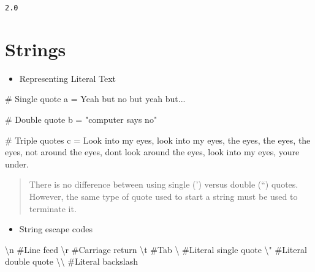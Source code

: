 \documentclass[
  letterpaper,
  DIV=11,
  numbers=noendperiod]{scrreprt}
\newenvironment{Shaded}{\begin{snugshade}}{\end{snugshade}}
\newcommand{\CharTok}[1]{\textcolor[rgb]{0.13,0.47,0.30}{#1}}
\newcommand{\CommentTok}[1]{\textcolor[rgb]{0.37,0.37,0.37}{#1}}
\newcommand{\NormalTok}[1]{\textcolor[rgb]{0.00,0.46,0.62}{#1}}
\newcommand{\OperatorTok}[1]{\textcolor[rgb]{0.37,0.37,0.37}{#1}}
\newcommand{\NormalTok}[1]{\textcolor[rgb]{0.00,0.48,0.65}{#1}}
\newcommand{\OperatorTok}[1]{\textcolor[rgb]{0.37,0.37,0.37}{#1}}
\newcommand{\StringTok}[1]{\textcolor[rgb]{0.13,0.47,0.30}{#1}}
\providecommand{\tightlist}{%
  \setlength{\itemsep}{0pt}\setlength{\parskip}{0pt}}
\begin{document}
\begin{Shaded}
\begin{Highlighting}[]
\begin{verbatim}
2.0
\end{verbatim}

\hypertarget{strings}{%
\section{Strings}\label{strings}}

\begin{itemize}
\tightlist
\item
  Representing Literal Text
\end{itemize}

\begin{Shaded}
\begin{Highlighting}[]
\CommentTok{\# Single quote}
\NormalTok{a }\OperatorTok{=} \StringTok{\textquotesingle{}Yeah but no but yeah but...\textquotesingle{}}

\CommentTok{\# Double quote}
\NormalTok{b }\OperatorTok{=} \StringTok{"computer says no"}

\CommentTok{\# Triple quotes}
\NormalTok{c }\OperatorTok{=} \StringTok{\textquotesingle{}\textquotesingle{}\textquotesingle{}}
\StringTok{Look into my eyes, look into my eyes, the eyes, the eyes, the eyes,}
\StringTok{not around the eyes,}
\StringTok{don\textquotesingle{}t look around the eyes,}
\StringTok{look into my eyes, you\textquotesingle{}re under.}
\StringTok{\textquotesingle{}\textquotesingle{}\textquotesingle{}}
\end{Highlighting}
\end{Shaded}

\begin{quote}
There is no difference between using single (') versus double (``)
quotes. However, the same type of quote used to start a string must be
used to terminate it.
\end{quote}

\begin{itemize}
\tightlist
\item
  String escape codes
\end{itemize}

\begin{Shaded}
\begin{Highlighting}[]
\CommentTok{\textquotesingle{}}\CharTok{\textbackslash{}n}\CommentTok{\textquotesingle{}}      \CommentTok{\#Line feed}
\CommentTok{\textquotesingle{}}\CharTok{\textbackslash{}r}\CommentTok{\textquotesingle{}}      \CommentTok{\#Carriage return}
\CommentTok{\textquotesingle{}}\CharTok{\textbackslash{}t}\CommentTok{\textquotesingle{}}      \CommentTok{\#Tab}
\CommentTok{\textquotesingle{}}\CharTok{\textbackslash{}\textquotesingle{}}\CommentTok{\textquotesingle{}}      \CommentTok{\#Literal single quote}
\CommentTok{\textquotesingle{}}\CharTok{\textbackslash{}"}\CommentTok{\textquotesingle{}}      \CommentTok{\#Literal double quote}
\CommentTok{\textquotesingle{}}\CharTok{\textbackslash{}\textbackslash{}}\CommentTok{\textquotesingle{}}      \CommentTok{\#Literal backslash}
\end{Highlighting}
\end{Shaded}


\end{Highlighting}
\end{Shaded}
\end{document}
